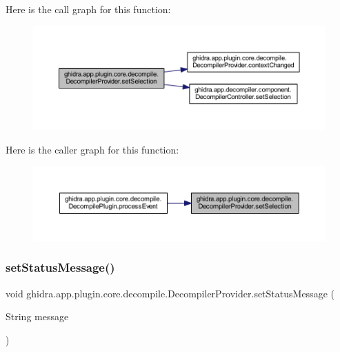 Here is the call graph for this function\+:
\nopagebreak
\begin{figure}[H]
\begin{center}
\leavevmode
\includegraphics[width=350pt]{classghidra_1_1app_1_1plugin_1_1core_1_1decompile_1_1_decompiler_provider_a8f71722592aba9ce781d418d25aa8f3c_cgraph}
\end{center}
\end{figure}
Here is the caller graph for this function\+:
\nopagebreak
\begin{figure}[H]
\begin{center}
\leavevmode
\includegraphics[width=350pt]{classghidra_1_1app_1_1plugin_1_1core_1_1decompile_1_1_decompiler_provider_a8f71722592aba9ce781d418d25aa8f3c_icgraph}
\end{center}
\end{figure}
\mbox{\label{classghidra_1_1app_1_1plugin_1_1core_1_1decompile_1_1_decompiler_provider_a729c019df8772c0ae39d1bce67b88ee5}} 
\subsubsection{\texorpdfstring{setStatusMessage()}{setStatusMessage()}}
{\footnotesize\ttfamily void ghidra.\+app.\+plugin.\+core.\+decompile.\+Decompiler\+Provider.\+set\+Status\+Message (\begin{DoxyParamCaption}\item[{String}]{message }\end{DoxyParamCaption})\hspace{0.3cm}{\ttfamily [inline]}}



